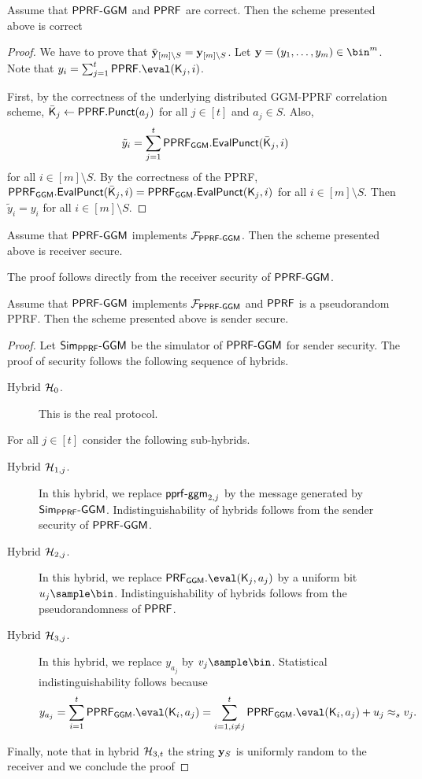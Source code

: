 \begin{lemma}[Correctness]
\label{lemma:correct-pprf-ggm}
Assume that $\mathsf{PPRF}\text{-}\mathsf{GGM}$ and $\mathsf{PPRF}$ are correct. Then the scheme presented above is correct
\end{lemma}
\begin{proof}
We have to prove that $\tilde {\mathbf{y}}_{[m]\setminus S}=\mathbf{y}_{[m]\setminus S}$. Let $\yn=(y_1,\dots ,y_m)\in\bin^m$. Note that $y_i=\sum_{j=1}^t \PPRF.\eval(\key_j,i) $.

First, by the correctness of the underlying distributed GGM-PPRF correlation scheme, $\bar{\mathsf{K}}_j\leftarrow\mathsf{PPRF.Punct}(a_j)$ for all $j\in[t]$ and $a_j\in S$. Also, $$\tilde y_i=\sum_{j=1}^t \mathsf{PPRF}_\mathsf{GGM}.\mathsf{EvalPunct}(\bar{\mathsf{K}}_j,i)$$ for all $i\in [m]\setminus S$. By the correctness of the PPRF, $\mathsf{PPRF}_\mathsf{GGM}.\mathsf{EvalPunct}(\bar {\mathsf{K}}_{j},i)=\mathsf{PPRF}_\mathsf{GGM}.\mathsf{EvalPunct}( \mathsf{K}_j,i)$ for all $i \in [m]\setminus S$. Then $\tilde y_i=y_i$ for all $i\in [m]\setminus S$.
\end{proof}



\begin{lemma}
Assume that $\mathsf{PPRF}\text{-}\mathsf{GGM}$ implements $\mathcal{F}_{\mathsf{PPRF}\text{-}\mathsf{GGM}}$. Then the scheme presented above is receiver secure.
\end{lemma}
The proof follows directly from the receiver security of $\mathsf{PPRF}\text{-}\mathsf{GGM}$.


\begin{lemma}
\label{lemma:send-sec-pprf-ggm}
Assume that $\mathsf{PPRF}\text{-}\mathsf{GGM}$ implements $\mathcal{F}_{\mathsf{PPRF}\text{-}\mathsf{GGM}}$ and $\mathsf{PPRF}$ is a pseudorandom PPRF. Then the scheme presented above is sender secure.
\end{lemma}
\begin{proof}
Let $\mathsf{Sim}_\mathsf{PPRF}\text{-}\mathsf{GGM}$ be the simulator of $\mathsf{PPRF}\text{-}\mathsf{GGM}$ for sender security. The proof of security follows the following sequence of hybrids.
\begin{description}
\item[Hybrid $\mathcal{H}_0$.] This is the real protocol.
\end{description}

For all $j\in[t]$ consider the following sub-hybrids.
\begin{description}
\item[Hybrid $\mathcal{H}_{1,j}$.] In this hybrid, we replace $\mathsf{pprf}\text{-}\mathsf{ggm}_{2,j}$ by the message generated by $\mathsf{Sim}_\mathsf{PPRF}\text{-}\mathsf{GGM}$. Indistinguishability of hybrids follows from the sender security of $\mathsf{PPRF}\text{-}\mathsf{GGM}$.
\item[Hybrid $\mathcal{H}_{2,j}$.]  In this hybrid, we replace $\PRF_\mathsf{GGM}.\eval(\key_j,a_j)$ by a uniform bit $u_{j}\sample \bin$. Indistinguishability of hybrids follows from the pseudorandomness of $\mathsf{PPRF}$.
\item[Hybrid $\mathcal{H}_{3,j}$.] In this hybrid, we replace $y_{a_j}$ by $v_j\sample \bin$. Statistical indistinguishability follows because $$y_{a_j}=\sum_{i=1}^t \PPRF_\mathsf{GGM}.\eval(\key_i,{a_j})=\sum_{i=1,i\neq j}^t \PPRF_\mathsf{GGM}.\eval(\key_i,{a_j}) + u_{j}\approx_s v_j.$$ 
 \end{description}
 Finally, note that in hybrid $\mathcal{H}_{3,t}$ the string $\mathbf{y}_S$ is uniformly random to the receiver and we conclude the proof 
\end{proof}


